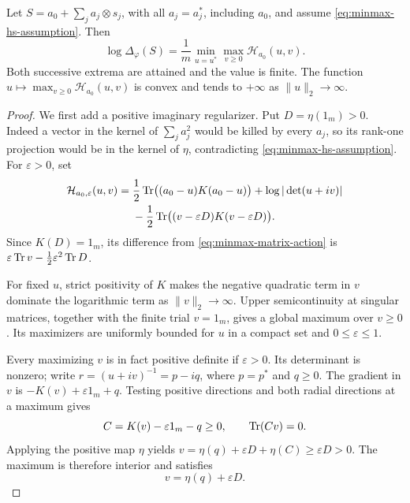 \begin{theorem}\label{prop:minmax-matrix}
Let $S=a_0+\sum_j a_j\otimes s_j$, with all $a_j=a_j^*$, including $a_0$, and assume \eqref{eq:minmax-hs-assumption}.
Then
\begin{equation}\label{eq:minmax-matrix}
 \log\Delta_\varphi(S)
 =\frac1m\min_{u=u^*}\max_{v\ge0}\mathcal H_{a_0}(u,v).
\end{equation}
Both successive extrema are attained and the value is finite.
The function $u\mapsto\max_{v\ge0}\mathcal H_{a_0}(u,v)$ is convex and tends to $+\infty$ as $\|u\|_2\to\infty$.
\end{theorem}

\begin{proof}
We first add a positive imaginary regularizer.
Put $D=\eta(1_m)>0$.
Indeed a vector in the kernel of $\sum_j a_j^2$ would be killed by every $a_j$, so its rank-one projection would be in the kernel of $\eta$, contradicting \eqref{eq:minmax-hs-assumption}.
For $\varepsilon>0$, set
\begin{equation}\label{eq:minmax-matrix-regularized}
\begin{split}
 \mathcal H_{a_0,\varepsilon}(u,v)
 ={}&\frac12\operatorname{Tr}\bigl((a_0-u)K(a_0-u)\bigr)
 +\log|\det(u+iv)|\\
 &-\frac12\operatorname{Tr}\bigl((v-\varepsilon D)K(v-\varepsilon D)\bigr).
\end{split}
\end{equation}
Since $K(D)=1_m$, its difference from \eqref{eq:minmax-matrix-action} is $\varepsilon\operatorname{Tr} v-\frac12\varepsilon^2\operatorname{Tr} D$.

For fixed $u$, strict positivity of $K$ makes the negative quadratic term in $v$ dominate the logarithmic term as $\|v\|_2\to\infty$.
Upper semicontinuity at singular matrices, together with the finite trial $v=1_m$, gives a global maximum over $v\ge0$.
Its maximizers are uniformly bounded for $u$ in a compact set and $0\le\varepsilon\le1$.

Every maximizing $v$ is in fact positive definite if $\varepsilon>0$.
Its determinant is nonzero; write $r=(u+iv)^{-1}=p-iq$, where $p=p^*$ and $q\ge0$.
The gradient in $v$ is $-K(v)+\varepsilon1_m+q$.
Testing positive directions and both radial directions at a maximum gives
\[
 C=K(v)-\varepsilon1_m-q\ge0,
 \qquad \operatorname{Tr}(Cv)=0.
\]
Applying the positive map $\eta$ yields $v=\eta(q)+\varepsilon D+\eta(C)\ge\varepsilon D>0$.
The maximum is therefore interior and satisfies
\begin{equation}\label{eq:minmax-matrix-inner}
 v=\eta(q)+\varepsilon D.
\end{equation}


\end{proof}
